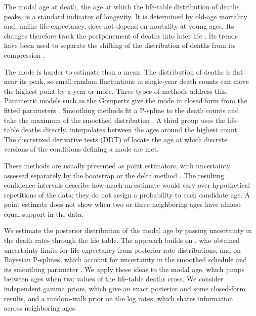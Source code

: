 \documentclass[12pt, letterpaper]{article}
\begin{document}
The modal age at death, the age at which the life-table distribution of deaths peaks, is a standard indicator of longevity. It is determined by old-age mortality and, unlike life expectancy, does not depend on mortality at young ages. Its changes therefore track the postponement of deaths into later life \citep{kannisto2001mode, canudas2008modal, horiuchi2013modal}. Its trends have been used to separate the shifting of the distribution of deaths from its compression \citep{canudas2008modal, bergeron2015decomposing}.

The mode is harder to estimate than a mean. The distribution of deaths is flat near its peak, so small random fluctuations in single-year death counts can move the highest point by a year or more. Three types of methods address this. Parametric models such as the Gompertz give the mode in closed form from the fitted parameters \citep{canudas2008modal, missov2015gompertz}. Smoothing methods fit a P-spline to the death counts and take the maximum of the smoothed distribution \citep{ouellette2011changes, horiuchi2013modal}. A third group uses the life-table deaths directly. \citet{kannisto2001mode} interpolates between the ages around the highest count. The discretized derivative tests (DDT) of \citet{vazquez2024longevity} locate the age at which discrete versions of the conditions defining a mode are met.

These methods are usually presented as point estimators, with uncertainty assessed separately by the bootstrap or the delta method \citep{andreev2010spreadsheet, keyfitz2005applied}. The resulting confidence intervals describe how much an estimate would vary over hypothetical repetitions of the data; they do not assign a probability to each candidate age. A point estimate does not show when two or three neighboring ages have almost equal support in the data.

We estimate the posterior distribution of the modal age by passing uncertainty in the death rates through the life table. The approach builds on \citet{andreev2015confidence}, who obtained uncertainty limits for life expectancy from posterior rate distributions, and on Bayesian P-splines, which account for uncertainty in the smoothed schedule and its smoothing parameter \citep{lang2004bayesian}. We apply these ideas to the modal age, which jumps between ages when two values of the life-table deaths cross. We consider independent gamma priors, which give an exact posterior and some closed-form results, and a random-walk prior on the log rates, which shares information across neighboring ages.
\end{document}

